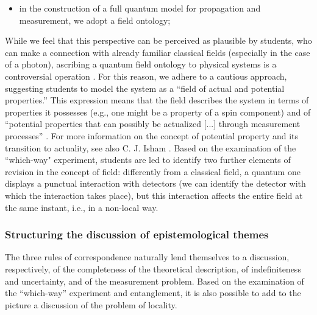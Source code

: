 \documentclass[twocolumn,secnumarabic,amssymb, nobibnotes, aps, prd, nofootinbib]{revtex4-2}
\begin{document}
\begin{itemize}
    \item in the construction of a full quantum model for propagation and measurement, we adopt a field ontology;
\end{itemize}

While we feel that this perspective can be perceived as plausible by students, who can make a connection with already familiar classical fields (especially in the case of a photon), ascribing a quantum field ontology to physical systems is a controversial operation \cite[e.g.,][pp. 133-135]{Passon2019, Norsen2017}. For this reason, we adhere to a cautious approach, suggesting students to model the system as a ``field of actual and potential properties.'' This expression means that the field describes the system in terms of properties it possesses (e.g., one might be a property of a spin component) and of ``potential properties that can possibly be actualized [...] through measurement processes'' \cite{Debianchi2013}. For more information on the concept of potential property and its transition to actuality, see also C. J. Isham \cite{Isham1995}. Based on the examination of the ``which-way" experiment, students are led to identify two further elements of revision in the concept of field: differently from a classical field, a quantum one displays a punctual interaction with detectors (we can identify the detector with which the interaction takes place), but this interaction affects the entire field at the same instant, i.e., in a non-local way.\\

\subsubsection{Structuring the discussion of epistemological themes} \label{Sec:3.5.2}

The three rules of correspondence naturally lend themselves to a discussion, respectively, of the completeness of the theoretical description, of indefiniteness and uncertainty, and of the measurement problem. Based on the examination of the ``which-way'' experiment and entanglement, it is also possible to add to the picture a discussion of the problem of locality.
\end{document}
